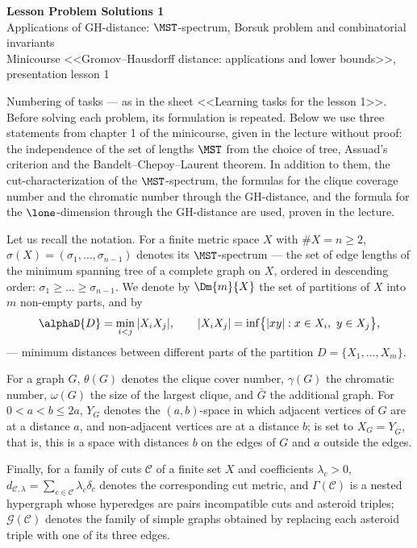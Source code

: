 \documentclass[a4paper,12pt]{report}
\begin{document}
\begin{center}
{\Large\bfseries Lesson Problem Solutions \textup{1}}\\[2mm]
{\large Applications of GH-distance: $\MST$-spectrum, Borsuk problem and combinatorial invariants}\\[2mm]
{\small Minicourse <<Gromov--Hausdorff distance: applications and lower bounds>>, presentation lesson \textup{1}}
\end{center}

Numbering of tasks --- as in the sheet <<Learning tasks for the lesson \textup{1}>>. Before solving each problem, its formulation is repeated. Below we use three statements from chapter \textup{1} of the minicourse, given in the lecture without proof\textup{:} the independence of the set of lengths $\MST$ from the choice of tree, Assuad's criterion and the Bandelt--Chepoy--Laurent theorem. In addition to them, the \textup{cut}-characterization of the $\MST$-spectrum, the formulas for the clique coverage number and the chromatic number through the GH-distance, and the formula for the $\lone$-dimension through the GH-distance are used, proven in the lecture.

Let us recall the notation. For a finite metric space $X$ with $\#X=n\ge2$, $\sigma(X)=(\sigma_1,\dots,\sigma_{n-1})$ denotes its $\MST$-spectrum --- the set of edge lengths of the minimum spanning tree of a complete graph on $X$, ordered in descending order\textup{:} $\sigma_1\ge\dots\ge\sigma_{n-1}$. We denote by $\Dm{m}{X}$ the set of partitions of $X$ into $m$ non-empty parts, and by
\[
\alphaD{D}=\min_{i<j}|X_iX_j|,\qquad |X_iX_j|=\inf\bigl\{|xy|:x\in X_i,\ y\in X_j\bigr\},
\]
--- minimum distances between different parts of the partition $D=\{X_1,\dots,X_m\}$.

For a graph $G$, $\theta(G)$ denotes the clique cover number, $\gamma(G)$ the chromatic number, $\omega(G)$ the size of the largest clique, and $\bar G$ the additional graph. For $0<a<b\le2a$, $Y_G$ denotes the $(a,b)$-space in which adjacent vertices of $G$ are at a distance $a$, and non-adjacent vertices are at a distance $b$\textup{;} is set to $X_G=Y_{\bar G}$, that is, this is a space with distances $b$ on the edges of $G$ and $a$ outside the edges.

Finally, for a family of cuts $\mathcal C$ of a finite set $X$ and coefficients $\lambda_c>0$, $d_{\mathcal C,\lambda}=\sum_{c\in\mathcal C}\lambda_c\delta_c$ denotes the corresponding cut metric, and $\Gamma(\mathcal C)$ is a nested hypergraph whose hyperedges are pairs incompatible cuts and asteroid triples\textup{;} $\mathcal G(\mathcal C)$ denotes the family of simple graphs obtained by replacing each asteroid triple with one of its three edges.
\end{document}
